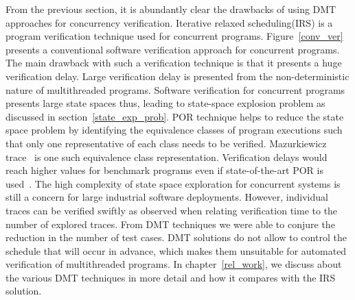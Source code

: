 From the previous section, it is abundantly clear the drawbacks of using DMT approaches for concurrency verification. 
Iterative relaxed scheduling(IRS) is a program verification technique used for concurrent programs. 
Figure~\ref{conv_ver} presents a conventional software verification approach for concurrent programs. 
The main drawback with such a verification technique is that it presents a huge verification delay. 
Large verification delay is presented from the non-deterministic nature of multithreaded programs. 
Software verification for concurrent programs presents large state spaces thus, leading to state-space explosion problem as discussed in section~\ref{state_exp_prob}. 
POR technique helps to reduce the state space problem by identifying the equivalence classes of program executions such that only one representative of each class needs to be verified. 
Mazurkiewicz trace~\citep{mazurkiewicz1986trace} is one such equivalence class representation. 
Verification delays would reach higher values for benchmark programs even if state-of-the-art POR is used~\citep{abdulla2014optimal}\citep{gueta2007cartesian}. 
The high complexity of state space exploration for concurrent systems is still a concern for large industrial software deployments. 
However, individual traces can be verified swiftly as observed when relating verification time to the number of explored traces. 
From DMT techniques we were able to conjure the reduction in the number of test cases. 
DMT solutions do not allow to control the schedule that will occur in advance, which makes them unsuitable for automated verification of multithreaded programs. 
In chapter~\ref{rel_work}, we discuss about the various DMT techniques in more detail and how it compares with the IRS solution. 

